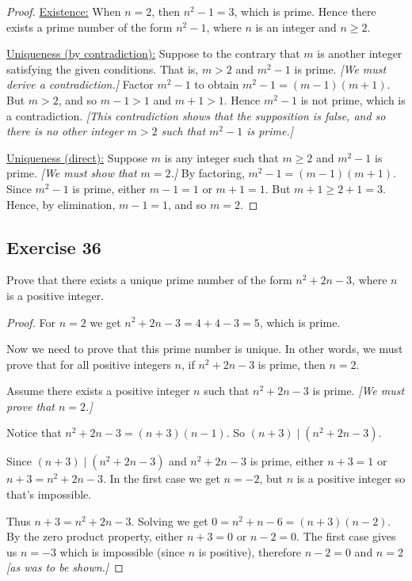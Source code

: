 \documentclass[14pt]{extarticle}
\begin{document}
\begin{proof}
\underline{Existence:} When $n = 2$, then $n^2 - 1 = 3$, which is prime. Hence there exists a prime number of the form $n^2 - 1$, where $n$ is an integer and $n \geq 2$.

\underline{Uniqueness (by contradiction):} Suppose to the
contrary that $m$ is another integer satisfying the given
conditions. That is, $m > 2$ and $m^2 - 1$ is prime. {\it [We must derive a contradiction.]} Factor $m^2 - 1$ to obtain $m^2 - 1 = (m - 1)(m + 1)$. But $m > 2$, and so $m - 1 > 1$ and $m + 1 > 1$. Hence $m^2 - 1$ is not prime, which is a contradiction. {\it [This contradiction shows that the supposition is false, and so there is no other integer $m > 2$ such that $m^2 - 1$ is prime.]}

\underline{Uniqueness (direct):} Suppose $m$ is any integer
such that $m \geq 2$ and $m^2 - 1$ is prime. {\it [We must show that $m = 2$.]} By factoring, $m^2 - 1 = (m - 1)(m + 1)$. Since $m^2 - 1$ is prime, either $m - 1 = 1$ or $m + 1 = 1$. But $m + 1 \geq 2 + 1 = 3$. Hence, by elimination, $m - 1 = 1$, and so $m = 2$.
\end{proof}

\subsection{Exercise 36}
Prove that there exists a unique prime number of the form $n^2 + 2n - 3$, where $n$ is a positive integer.

\begin{proof}
For $n=2$ we get $n^2 + 2n - 3 = 4 + 4 - 3 = 5$, which is prime. 

Now we need to prove that this prime number is unique. In other words, we must prove that for all positive integers $n$, if $n^2 + 2n - 3$ is prime, then $n=2$.

Assume there exists a positive integer $n$ such that $n^2 + 2n - 3$ is prime. {\it[We must prove that $n = 2$.]}

Notice that $n^2 + 2n - 3 = (n+3)(n-1)$. So $(n+3) \mid (n^2 + 2n - 3)$.

Since $(n+3) \mid (n^2 + 2n - 3)$ and $n^2 + 2n - 3$ is prime, either $n+3 = 1$ or $n+3 = n^2 + 2n - 3$. In the first case we get $n = -2$, but $n$ is a positive integer so that's impossible. 

Thus $n+3 = n^2 + 2n - 3$. Solving we get $0 = n^2 + n - 6 = (n+3)(n-2)$. By the zero product property, either $n+3 = 0$ or $n-2 = 0$. The first case gives us $n = -3$ which is impossible (since $n$ is positive), therefore $n-2 = 0$ and $n=2$ {\it [as was to be shown.]}
\end{proof}
\end{document}
